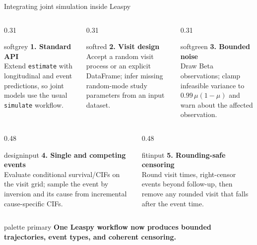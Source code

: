 \documentclass{beamer}
\newcommand{\takeaway}[1]{%
  \begin{beamercolorbox}[rounded=true,sep=0.7ex,wd=\linewidth]{palette primary}
    \centering\bfseries #1
  \end{beamercolorbox}}
\newcommand{\softbox}[2]{%
  \begin{beamercolorbox}[rounded=true,sep=0.8ex,wd=\linewidth]{#1}#2\end{beamercolorbox}}
\begin{document}
\begin{frame}{Integrating joint simulation inside Leaspy} 
  \scriptsize
  \begin{columns}[T,onlytextwidth]
    \begin{column}{0.31\textwidth}
      \softbox{softgrey}{
        \textbf{1. Standard API}\\[0.2em]
        Extend \texttt{estimate} with longitudinal and event predictions, so joint models use the usual \texttt{simulate} workflow.
      }
    \end{column}
    \pause
    \begin{column}{0.31\textwidth}
      \softbox{softred}{
        \textbf{2. Visit design}\\[0.2em]
        Accept a random visit process or an explicit DataFrame; infer missing random-mode study parameters from an input dataset.
      }
    \end{column}
    \pause 
    \begin{column}{0.31\textwidth}
      \softbox{softgreen}{
        \textbf{3. Bounded noise}\\[0.2em]
        Draw Beta observations; clamp infeasible variance to $0.99\,\mu(1-\mu)$ and warn about the affected observation.
      }
    \end{column}
  \end{columns}

  \vspace{0.35em}
  \begin{columns}[T,onlytextwidth]
    \pause
    \begin{column}{0.48\textwidth}
      \softbox{designinput}{
        \textbf{4. Single and competing events}\\[0.2em]
        Evaluate conditional survival/CIFs on the visit grid; sample the event by inversion and its cause from incremental cause-specific CIFs.
      }
    \end{column}
    \pause
    \begin{column}{0.48\textwidth}
      \softbox{fitinput}{
        \textbf{5. Rounding-safe censoring}\\[0.2em]
        Round visit times, right-censor events beyond follow-up, then remove any rounded visit that falls after the event time.
      }
    \end{column}
  \end{columns}

  \vspace{0.4em}
  \takeaway{One Leaspy workflow now produces bounded trajectories, event types, and coherent censoring.}
\end{frame}
\end{document}
